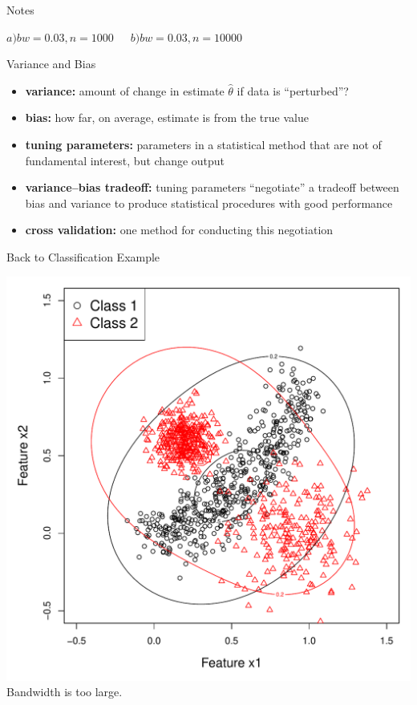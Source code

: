 \documentclass[12pt]{beamer}
\begin{document}
\begin{frame}{Notes}
\begin{itemize}
\begin{center}
      $a) bw=0.03, n = 1000 \, \, \, \, \,  \, \, \, \, b) bw=0.03, n=10000$
    \end{center}
  \end{itemize}
\end{frame}

\begin{frame}{Variance and Bias}
  \begin{itemize}
  \item \textbf{variance:} amount of change in estimate $\widehat{\theta}$  if data is ``perturbed''?
  \item \textbf{bias:} how far, on average, estimate is from the true value
  \item \textbf{tuning parameters:} parameters in a statistical method that are not of fundamental interest, but change output
  \item \textbf{variance--bias tradeoff:} tuning parameters ``negotiate'' a tradeoff between bias and variance to produce statistical procedures with good performance
  \item \textbf{cross validation:} one method for conducting this negotiation
  \end{itemize}

\end{frame}



\begin{frame}{Back to Classification Example}

  \begin{center}
    \includegraphics[scale=0.4]{figs/kde2d3.pdf}\\
    Bandwidth is too large.
  \end{center}
  
\end{frame}
\end{document}
